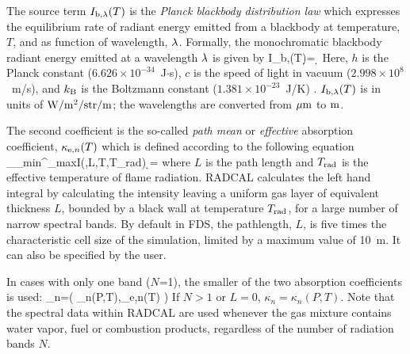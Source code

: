 The source term $I_{\rm b,\lambda}(T)$ is the {\em Planck blackbody distribution law} which expresses the equilibrium rate of radiant
energy emitted from a blackbody at temperature, $T$, and as function of wavelength, $\lambda$. Formally, the monochromatic blackbody
radiant energy emitted at a wavelength $\lambda$ is given by \cite{Penner:1959}
\be \label{eq:Planck_law}
I_{\rm b,\la}(T)\d \la = \d \la
\ee
Here, $h$ is the Planck constant ($6.626 \times 10^{-34}$~J$\cdot$s), $c$ is the speed of light in vacuum ($2.998 \times
10^8$~m/s), and $k_{\rm B}$ is the Boltzmann constant ($1.381 \times 10^{-23}$~J/K) \cite{Mohr:2012}.
$I_{\rm b,\lambda}(T)$ is in units of $\rm{W/m^{2}/str/m}$; the wavelengths are converted from $\rm{\mu m}$ to $\rm{m}$.

The second coefficient is the so-called {\em path mean} or {\em effective} absorption coefficient, $\kappa_{{\rm e},n}(T)$ which
is defined according to the following equation
\be
   \int_{\la_{\rm min}}^{\la_{\rm max}}I(\la,L,T,T_{\rm rad}) \; \d \la = \frac{\sigma}{\pi}
\ee
where $L$ is the path length and $T_{\rm rad}$ is the effective temperature of flame radiation. RADCAL calculates the left hand
integral by calculating the intensity leaving a uniform gas layer of equivalent thickness $L$, bounded by a black wall at
temperature $T_{\rm rad}$, for a large number of narrow spectral bands.  By default in FDS, the pathlength, $L$, is five times the
characteristic cell size of the simulation, limited by a maximum value of 10~m. It can also be specified by the user.

In cases with only one band ($N$=1), the smaller of the two absorption coefficients is used:
\be
   \kappa_n=\min \Big( \kappa_n(P,T),\kappa_{{\rm e},n}(T) \Big)
\ee
If $N>1$ or $L=0$, $\kappa_n=\kappa_n(P,T)$. Note that the spectral data within RADCAL are used whenever the gas mixture contains
water vapor, fuel or combustion products, regardless of the number of radiation bands $N$.

